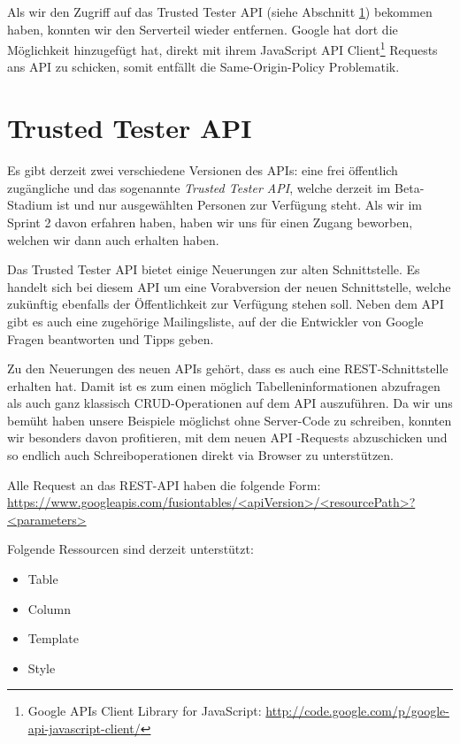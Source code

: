 Als wir den Zugriff auf das Trusted Tester API (siehe Abschnitt \ref{trusted-tester-api}) bekommen haben, konnten wir den Serverteil wieder entfernen. Google hat dort die Möglichkeit hinzugefügt hat, direkt mit ihrem JavaScript API Client\footnote{Google APIs Client Library for JavaScript: \url{http://code.google.com/p/google-api-javascript-client/}} Requests ans API zu schicken, somit entfällt die Same-Origin-Policy Problematik.

\section{Trusted Tester API}
\label{trusted-tester-api}
Es gibt derzeit zwei verschiedene Versionen des \gls{API}s: eine frei öffentlich zugängliche und das sogenannte \emph{Trusted Tester \gls{API}}, welche derzeit im Beta-Stadium ist und nur ausgewählten Personen zur Verfügung steht. Als wir im Sprint 2 davon erfahren haben, haben wir uns für einen Zugang beworben, welchen wir dann auch erhalten haben.

Das Trusted Tester \gls{API} bietet einige Neuerungen zur alten Schnittstelle. Es handelt sich bei diesem \gls{API} um eine Vorabversion der neuen Schnittstelle, welche zukünftig ebenfalls der Öffentlichkeit zur Verfügung stehen soll. Neben dem \gls{API} gibt es auch eine zugehörige Mailingsliste, auf der die Entwickler von Google Fragen beantworten und Tipps geben.

Zu den Neuerungen des neuen \gls{API}s gehört, dass es auch eine \gls{REST}-Schnittstelle erhalten hat. Damit ist es zum einen möglich Tabelleninformationen abzufragen als auch ganz klassisch CRUD-Operationen auf dem \gls{API} auszuführen. Da wir uns bemüht haben unsere Beispiele möglichst ohne Server-Code zu schreiben, konnten wir besonders davon profitieren, mit dem neuen \gls{API} -Requests abzuschicken und so endlich auch Schreiboperationen direkt via Browser zu unterstützen.

Alle Request an das \gls{REST}-\gls{API} haben die folgende Form: \\
\url{https://www.googleapis.com/fusiontables/<apiVersion>/<resourcePath>?<parameters>}

Folgende Ressourcen sind derzeit unterstützt:
\begin{itemize}
	\item Table
	\item Column
	\item Template
	\item Style
\end{itemize}

